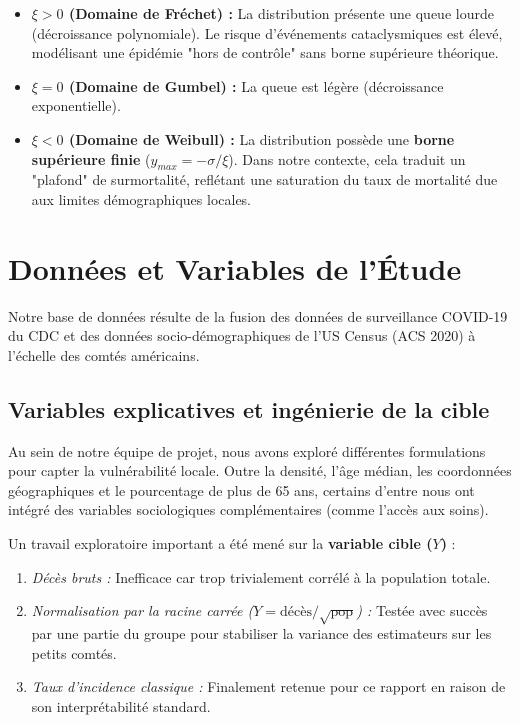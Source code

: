 \documentclass[11pt,a4paper]{article}
\begin{document}
\begin{tcolorbox}[colback=defgray, colframe=bordergray, title=\textbf{Les trois domaines d'attraction}, arc=2mm]
\begin{itemize}
    \item \textbf{$\xi > 0$ (Domaine de Fréchet) :} La distribution présente une queue lourde (décroissance polynomiale). Le risque d'événements cataclysmiques est élevé, modélisant une épidémie "hors de contrôle" sans borne supérieure théorique.
    \item \textbf{$\xi = 0$ (Domaine de Gumbel) :} La queue est légère (décroissance exponentielle).
    \item \textbf{$\xi < 0$ (Domaine de Weibull) :} La distribution possède une \textbf{borne supérieure finie} ($y_{max} = -\sigma / \xi$). Dans notre contexte, cela traduit un "plafond" de surmortalité, reflétant une saturation du taux de mortalité due aux limites démographiques locales.
\end{itemize}
\end{tcolorbox}

\section{Données et Variables de l'Étude}

Notre base de données résulte de la fusion des données de surveillance COVID-19 du CDC et des données socio-démographiques de l'US Census (ACS 2020) à l'échelle des comtés américains.

\subsection{Variables explicatives et ingénierie de la cible}
Au sein de notre équipe de projet, nous avons exploré différentes formulations pour capter la vulnérabilité locale. Outre la densité, l'âge médian, les coordonnées géographiques et le pourcentage de plus de 65 ans, certains d'entre nous ont intégré des variables sociologiques complémentaires (comme l'accès aux soins).

Un travail exploratoire important a été mené sur la \textbf{variable cible ($Y$)} :
\begin{enumerate}
    \item \textit{Décès bruts :} Inefficace car trop trivialement corrélé à la population totale.
    \item \textit{Normalisation par la racine carrée ($Y = \text{décès}/\sqrt{\text{pop}}$) :} Testée avec succès par une partie du groupe pour stabiliser la variance des estimateurs sur les petits comtés.
    \item \textit{Taux d'incidence classique :} Finalement retenue pour ce rapport en raison de son interprétabilité standard.
\end{enumerate}
\end{document}
